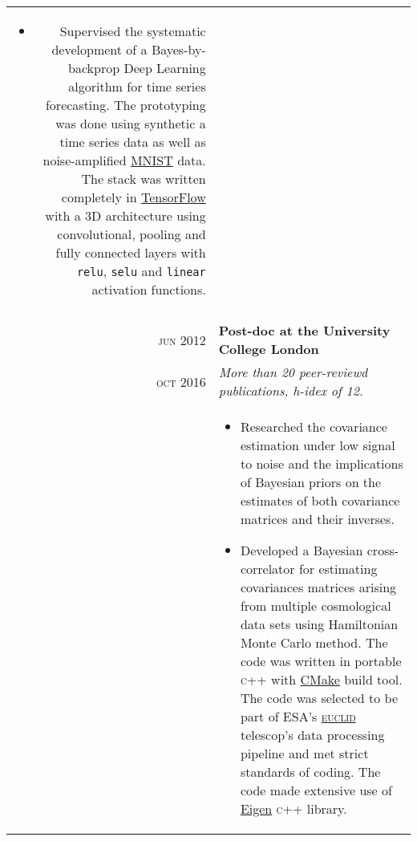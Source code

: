 \documentclass[a4paper,10pt]{article}
\begin{document}
\begin{tabular}{r|p{11cm}}
{\begin{itemize}
  and \href{http://scikit-learn.org/stable/}{scikit-learn}.
  \item Supervised the systematic development of a Bayes-by-backprop Deep Learning algorithm for time
  series forecasting. The prototyping was done using synthetic a time series data as well as noise-amplified
  \href{http://yann.lecun.com/exdb/mnist/}{MNIST} data. The stack was written completely in
  \href{https://www.tensorflow.org/}{TensorFlow} with a 3D architecture using convolutional,
  pooling and fully connected layers with \texttt{relu}, \texttt{selu} and \texttt{linear} activation functions.

\end{itemize}
}\\
\multicolumn{2}{c}{} \\
\textsc{jun 2012} & \textbf{Post-doc at the University College London} \\
\textsc{oct 2016}	&\emph{More than 20 peer-reviewd publications, h-idex of 12.}\\
&\small{
\begin{itemize}
  \item Researched the covariance estimation under low signal to noise and the implications of Bayesian priors on the
  estimates of both covariance matrices and their inverses.
  \item Developed a Bayesian cross-correlator for estimating covariances matrices arising from multiple cosmological
  data sets using Hamiltonian Monte Carlo method. The code was written in portable \textsc{c++} with
  \href{https://cmake.org/}{CMake} build tool.
  The code was selected to be part of ESA's \href{https://www.euclid-ec.org/}{\textsc{euclid}} telescop's data processing   pipeline and met strict standards
  of coding. The code made extensive use of \href{http://eigen.tuxfamily.org/index.php?title=Main_Page}{Eigen} \textsc{c++} library.
\end{itemize}
}
\end{tabular}
\end{document}
